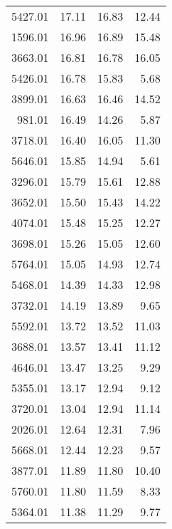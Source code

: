 \begin{table}
\begin{tabular}{rrrr}
5427.01 &            17.11 &            16.83 &            12.44 \\
1596.01 &            16.96 &            16.89 &            15.48 \\
3663.01 &            16.81 &            16.78 &            16.05 \\
5426.01 &            16.78 &            15.83 &             5.68 \\
3899.01 &            16.63 &            16.46 &            14.52 \\
 981.01 &            16.49 &            14.26 &             5.87 \\
3718.01 &            16.40 &            16.05 &            11.30 \\
5646.01 &            15.85 &            14.94 &             5.61 \\
3296.01 &            15.79 &            15.61 &            12.88 \\
3652.01 &            15.50 &            15.43 &            14.22 \\
4074.01 &            15.48 &            15.25 &            12.27 \\
3698.01 &            15.26 &            15.05 &            12.60 \\
5764.01 &            15.05 &            14.93 &            12.74 \\
5468.01 &            14.39 &            14.33 &            12.98 \\
3732.01 &            14.19 &            13.89 &             9.65 \\
5592.01 &            13.72 &            13.52 &            11.03 \\
3688.01 &            13.57 &            13.41 &            11.12 \\
4646.01 &            13.47 &            13.25 &             9.29 \\
5355.01 &            13.17 &            12.94 &             9.12 \\
3720.01 &            13.04 &            12.94 &            11.14 \\
2026.01 &            12.64 &            12.31 &             7.96 \\
5668.01 &            12.44 &            12.23 &             9.57 \\
3877.01 &            11.89 &            11.80 &            10.40 \\
5760.01 &            11.80 &            11.59 &             8.33 \\
5364.01 &            11.38 &            11.29 &             9.77 \\

\end{tabular}
\end{table}
